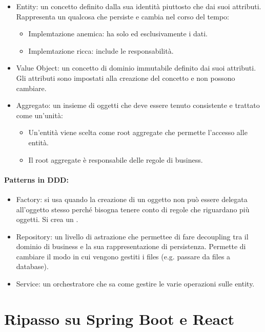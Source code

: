 \begin{itemize}
	\item Entity: un concetto definito dalla sua identità piuttosto che dai suoi attributi. Rappresenta un qualcosa che persiste e cambia nel corso del tempo:
	      \begin{itemize}
		      \item Implemtazione anemica: ha solo ed esclusivamente i dati.
		      \item Implemtazione ricca: include le responsabilità.
	      \end{itemize}
	\item Value Object: un concetto di dominio immutabile definito dai suoi attributi. Gli attributi sono impostati alla creazione del concetto e non possono cambiare.
	\item Aggregato: un insieme di oggetti che deve essere tenuto consistente e trattato come un'unità:
	      \begin{itemize}
		      \item Un'entità viene scelta come root aggregate che permette l'accesso alle entità.
		      \item Il root aggregate è responsabile delle regole di business.
	      \end{itemize}
\end{itemize}

\paragraph{Patterns in DDD:}

\begin{itemize}
	\item Factory: si usa quando la creazione di un oggetto non può essere delegata all'oggetto stesso perché bisogna tenere conto di regole che riguardano più oggetti. Si crea un .
	\item Repository: un livello di astrazione che permettee di fare decoupling tra il dominio di business e la sua rappresentazione di persistenza. Permette di cambiare il modo in cui vengono gestiti i files (e.g. passare da files a database).
	\item Service: un orchestratore che sa come gestire le varie operazioni sulle entity.
\end{itemize}

\section{Ripasso su Spring Boot e React}

